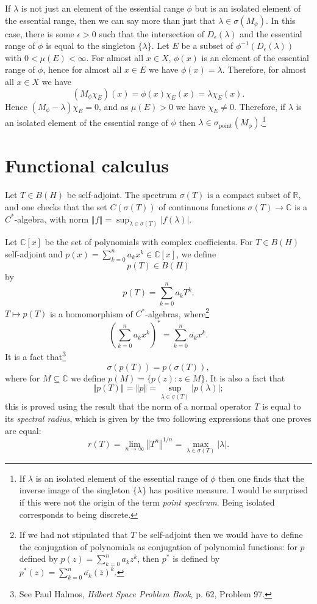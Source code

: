 \documentclass{article}
\newcommand{\point}{\sigma_{\textrm{point}}}
\newcommand{\norm}[1]{\left\Vert #1 \right\Vert}
\begin{document}
If  $\lambda$ is not just an element of the essential range $\phi$ 
 but is an isolated element of the essential range, then we can say more
than just that $\lambda \in \sigma(M_\phi)$. In this case, there is some $\epsilon>0$ such that the intersection
of
$D_\epsilon(\lambda)$  and the essential range of $\phi$ is equal to the singleton $\{\lambda\}$. Let $E$ be a subset of $\phi^{-1}(D_\epsilon(\lambda))$ with
$0<\mu(E)<\infty$.  For almost all $x \in X$, $\phi(x)$ is an element of the essential range of $\phi$, hence for almost all  $x \in E$ we have $\phi(x)=\lambda$. Therefore,
 for almost all  $x \in X$ we have
\[
(M_\phi \chi_E)(x)=\phi(x) \chi_E(x)=\lambda \chi_E(x).
\]
Hence $(M_\phi - \lambda)\chi_E=0$, and as $\mu(E)>0$ we have $\chi_E \neq 0$. Therefore, if $\lambda$ is an isolated element of the essential range of $\phi$ then
$\lambda \in \point(M_\phi)$.\footnote{If $\lambda$ is an isolated element of the essential range of $\phi$ then 
one finds that the inverse image of the singleton
$\{\lambda\}$ 
has positive measure.
I would be surprised if this were not the origin of the term {\em point spectrum}. Being isolated corresponds to being discrete.}






\section{Functional calculus}
Let $T \in B(H)$ be self-adjoint. The spectrum $\sigma(T)$ is a compact
subset of $\mathbb{R}$, and one checks that the set $C(\sigma(T))$ 
of continuous functions $\sigma(T) \to \mathbb{C}$ is a $C^*$-algebra, with norm
$\norm{f}=\sup_{\lambda \in \sigma(T)} |f(\lambda)|$. 

Let $\mathbb{C}[x]$ be the set of polynomials with complex coefficients. For
$T \in B(H)$ self-adjoint and $p(x)=\sum_{k=0}^n a_k x^k \in \mathbb{C}[x]$, we define 
\[
p(T) \in B(H)
\]
by
\[
p(T)=\sum_{k=0}^n a_k T^k.
\]
$T \mapsto p(T)$ is a homomorphism of $C^*$-algebras, where\footnote{If we had not stipulated that $T$ be self-adjoint then
we would have to define the conjugation of polynomials as conjugation of polynomial functions: for $p$ defined by
$p(z)=\sum_{k=0}^n a_k z^k$, then
$p^*$ is defined by $p^*(z)=\sum_{k=0}^n \overline{a_k} (\overline{z})^k$.}
\[
\left(\sum_{k=0}^n a_k x^k \right)^*=\sum_{k=0}^n \overline{a_k} x^k.
\]
It is a fact that\footnote{See Paul Halmos, {\em Hilbert Space Problem Book}, 
p. 62, Problem 97.}
\[
\sigma(p(T))=p(\sigma(T)),
\]
 where for $M \subseteq \mathbb{C}$
we define
$p(M)=\{p(z):z \in M\}$. It is also a fact that 
\[
\norm{p(T)}=\norm{p}=\sup_{\lambda \in \sigma(T)} |p(\lambda)|;
\]
this is proved using the result that the norm of a normal operator $T$ is equal to its {\em spectral radius}, which is given by the two
following expressions that one proves are equal:
\[
r(T)=\lim_{n \to \infty} \norm{T^n}^{1/n}=\max_{\lambda \in \sigma(T)} |\lambda|.
\]
\end{document}
